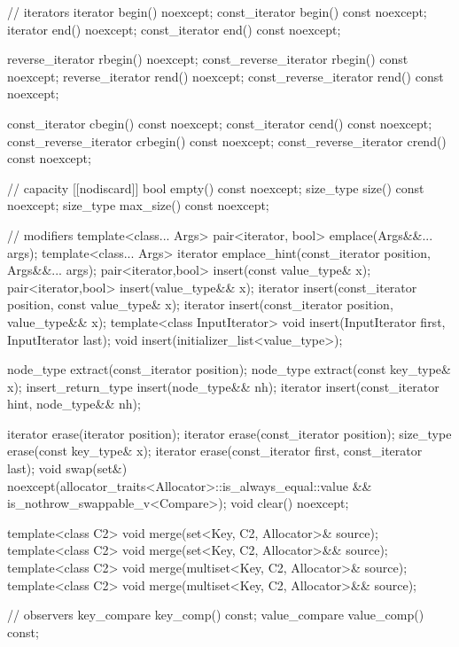 \begin{codeblock}
{{    // iterators
    iterator               begin() noexcept;
    const_iterator         begin() const noexcept;
    iterator               end() noexcept;
    const_iterator         end() const noexcept;

    reverse_iterator       rbegin() noexcept;
    const_reverse_iterator rbegin() const noexcept;
    reverse_iterator       rend() noexcept;
    const_reverse_iterator rend() const noexcept;

    const_iterator         cbegin() const noexcept;
    const_iterator         cend() const noexcept;
    const_reverse_iterator crbegin() const noexcept;
    const_reverse_iterator crend() const noexcept;

    // capacity
    [[nodiscard]] bool empty() const noexcept;
    size_type size() const noexcept;
    size_type max_size() const noexcept;

    // modifiers
    template<class... Args> pair<iterator, bool> emplace(Args&&... args);
    template<class... Args> iterator emplace_hint(const_iterator position, Args&&... args);
    pair<iterator,bool> insert(const value_type& x);
    pair<iterator,bool> insert(value_type&& x);
    iterator insert(const_iterator position, const value_type& x);
    iterator insert(const_iterator position, value_type&& x);
    template<class InputIterator>
      void insert(InputIterator first, InputIterator last);
    void insert(initializer_list<value_type>);

    node_type extract(const_iterator position);
    node_type extract(const key_type& x);
    insert_return_type insert(node_type&& nh);
    iterator           insert(const_iterator hint, node_type&& nh);

    iterator  erase(iterator position);
    iterator  erase(const_iterator position);
    size_type erase(const key_type& x);
    iterator  erase(const_iterator first, const_iterator last);
    void      swap(set&)
      noexcept(allocator_traits<Allocator>::is_always_equal::value &&
               is_nothrow_swappable_v<Compare>);
    void      clear() noexcept;

    template<class C2>
      void merge(set<Key, C2, Allocator>& source);
    template<class C2>
      void merge(set<Key, C2, Allocator>&& source);
    template<class C2>
      void merge(multiset<Key, C2, Allocator>& source);
    template<class C2>
      void merge(multiset<Key, C2, Allocator>&& source);

    // observers
    key_compare key_comp() const;
    value_compare value_comp() const;

}}
\end{codeblock}
